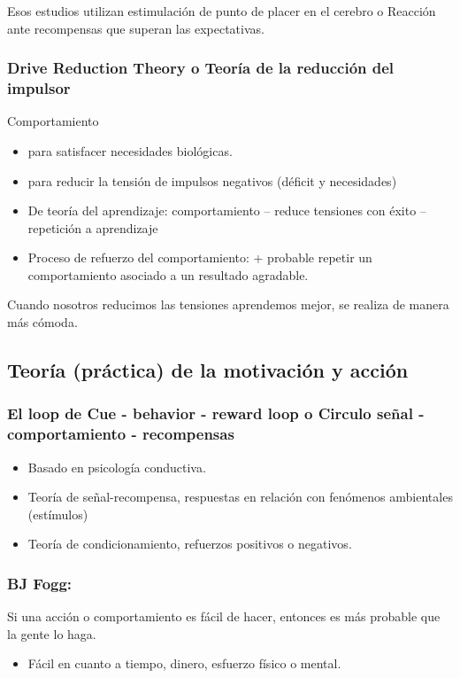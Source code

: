 \documentclass[12pt]{report} %
\begin{document}
Esos estudios utilizan estimulación de punto de placer en el cerebro o Reacción ante recompensas que superan las expectativas.

\subsubsection{Drive Reduction Theory o Teoría de la reducción del impulsor}
Comportamiento
\begin{itemize}
  \item para satisfacer necesidades biológicas.
  \item para reducir la tensión de impulsos negativos (déficit y necesidades)
  \item De teoría del aprendizaje: comportamiento – reduce tensiones con éxito – repetición a aprendizaje
  \item Proceso de refuerzo del comportamiento: + probable repetir un comportamiento asociado a un resultado agradable.
\end{itemize}
Cuando nosotros reducimos las tensiones aprendemos mejor, se realiza de manera más cómoda.

\subsection{Teoría (práctica) de la motivación y acción}
\subsubsection{El loop de Cue - behavior - reward loop o Circulo señal - comportamiento - recompensas}
\begin{itemize}
  \item Basado en psicología conductiva.
  \item Teoría de señal-recompensa, respuestas en relación con fenómenos ambientales (estímulos)
  \item Teoría de condicionamiento, refuerzos positivos o negativos.
\end{itemize} 

\subsubsection{BJ Fogg:}
Si una acción o comportamiento es fácil de hacer, entonces es más probable que la gente lo haga.
\begin{itemize}
  \item Fácil en cuanto a tiempo, dinero, esfuerzo físico o mental.
\end{itemize}
\end{document}
